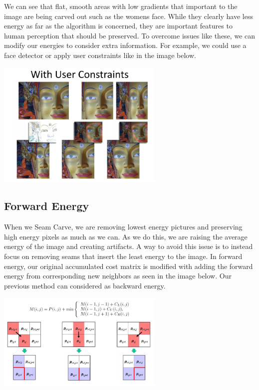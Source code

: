 \documentclass{article}
\begin{document}
We can see that flat, smooth areas with low gradients that important to the image are being carved out such as the womens face. While they clearly have less energy as far as the algorithm is concerned, they are important features to human perception that should be preserved. To overcome issues like these, we can modify our energies to consider extra information. For example, we could use a face detector or apply user constraints like in the image below. 

\begin{center}
\includegraphics[width=8cm]{user_constraints.PNG} \\
\end{center}
%

\subsection{Forward Energy}
When we Seam Carve, we are removing lowest energy pictures and preserving high energy pixels as much as we can. As we do this, we are raising the average energy of the image and creating artifacts. A way to avoid this issue is to instead focus on removing seams that insert the least energy to the image. In forward energy, our original accumulated cost matrix is modified with adding the forward energy from corresponding new neighbors as seen in the image below. Our previous method can considered as backward energy. 

\begin{center}
\includegraphics[width=8cm]{forward_energy_calculation.JPG} 
\end{center}
\end{document}
